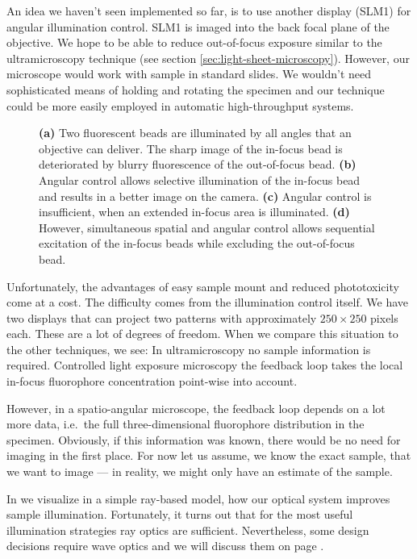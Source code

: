 An idea we haven't seen implemented so far, is to use another display
(SLM1) for angular illumination control. SLM1 is imaged into the back
focal plane of the objective. We hope to be able to reduce
out-of-focus exposure similar to the ultramicroscopy technique (see
section \ref{sec:light-sheet-microscopy}). However, our microscope
would work with sample in standard slides. We wouldn't need
sophisticated means of holding and rotating the specimen and our
technique could be more easily employed in automatic high-throughput
systems.

\begin{figure}[!hbt]
  \centering
  \def\svgscale{.43}
  
  \caption{{\bf (a)} Two fluorescent beads are illuminated by all
    angles that an objective can deliver. The sharp image of the
    in-focus bead is deteriorated by blurry fluorescence of the
    out-of-focus bead. {\bf (b)} Angular control allows selective
    illumination of the in-focus bead and results in a better image on
    the camera. {\bf (c)} Angular control is insufficient, when an
    extended in-focus area is illuminated. {\bf (d)} However,
    simultaneous spatial and angular control allows sequential
    excitation of the in-focus beads while excluding the out-of-focus
    bead.}
  \label{fig:hourglass-all}
\end{figure}

Unfortunately, the advantages of easy sample mount and reduced
phototoxicity come at a cost. The difficulty comes from the
illumination control itself. We have two displays that can project two
patterns with approximately $250\times 250$ pixels each. These are a
lot of degrees of freedom.  When we compare this situation to the
other techniques, we see: In ultramicroscopy no sample information is
required. Controlled light exposure microscopy the feedback loop takes
the local in-focus fluorophore concentration point-wise into account.

However, in a spatio-angular microscope, the feedback loop depends on
a lot more data, i.e.\ the full three-dimensional fluorophore
distribution in the specimen. Obviously, if this information was
known, there would be no need for imaging in the first place. For now
let us assume, we know the exact sample, that we want to image --- in
reality, we might only have an estimate of the sample.

In  we visualize in a simple ray-based
model, how our optical system improves sample
illumination. Fortunately, it turns out that for the most useful
illumination strategies ray optics are sufficient. Nevertheless, some
design decisions require wave optics and we will discuss them on page
\pageref{sec:wave-constraints}.

